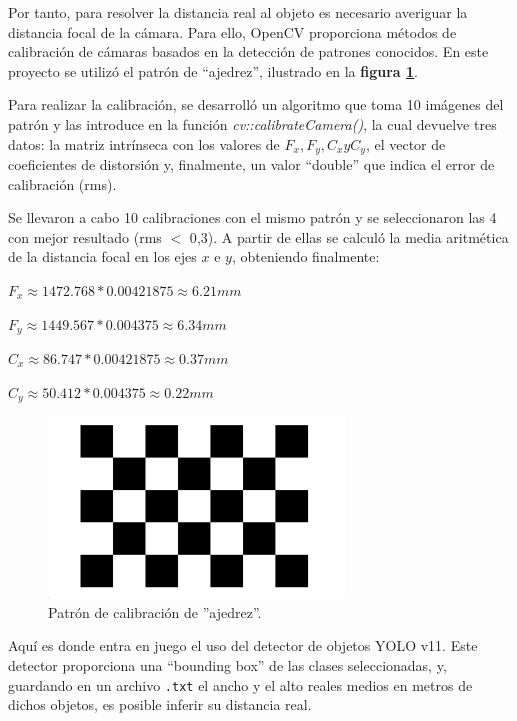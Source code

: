 Por tanto, para resolver la distancia real al objeto es necesario averiguar la distancia focal de la cámara. Para ello, OpenCV proporciona métodos de calibración de cámaras basados en la detección de patrones conocidos. En este proyecto se utilizó el patrón de ``ajedrez'', ilustrado en la \textbf{figura \ref{fig:patron_ajedrez}}.

Para realizar la calibración, se desarrolló un algoritmo que toma 10 imágenes del patrón y las introduce en la función \textit{cv::calibrateCamera()}, la cual devuelve tres datos: la matriz intrínseca con los valores de $F_x, F_y, C_xyC_y$, el vector de coeficientes de distorsión y, finalmente, un valor ``double'' que indica el error de calibración (rms).

Se llevaron a cabo 10 calibraciones con el mismo patrón y se seleccionaron las 4 con mejor resultado (rms $<$ 0{,}3). A partir de ellas se calculó la media aritmética de la distancia focal en los ejes $x$ e $y$, obteniendo finalmente:

$F_x \approx 1472.768 * 0.00421875 \approx 6.21 mm$

$F_y \approx 1449.567 * 0.004375 \approx 6.34 mm$

$C_x \approx 86.747 * 0.00421875 \approx 0.37 mm$

$C_y \approx 50.412 * 0.004375 \approx 0.22 mm$



\begin{figure}[h]
    \centering
    \includegraphics[width=0.7\textwidth]{images/calibracion_ajedrez.png}
    \caption{Patrón de calibración de ''ajedrez''.}
    \label{fig:patron_ajedrez}
\end{figure}


Aquí es donde entra en juego el uso del detector de objetos YOLO v11. Este detector proporciona una ``bounding box'' de las clases seleccionadas, y, guardando en un archivo \texttt{.txt} el ancho y el alto reales medios en metros de dichos objetos, es posible inferir su distancia real.

